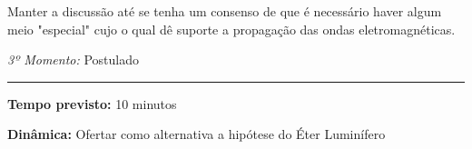     Manter a discussão até se tenha um consenso de que é necessário haver algum meio "especial" cujo o qual dê suporte a propagação das ondas eletromagnéticas.
    

    \newpage
    \bigskip
    \noindent\emph{3º Momento:} Postulado
    \par\noindent\rule{.3\textwidth}{.5pt}  
    \par\noindent\textbf{Tempo previsto:} 10 minutos
    \smallskip
    \par\noindent\textbf{Dinâmica:} Ofertar como alternativa a hipótese do Éter Luminífero


